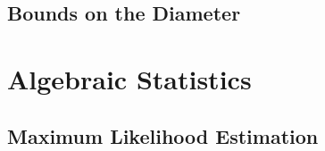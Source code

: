 \documentclass[12pt,a4paper]{book}
\theoremstyle{theorem}
\theoremstyle{definition}
\theoremstyle{remark}
\begin{document}


	



\chapter{Bounds on the Diameter} \label{ch:BoundsDiameter}


	







\part{Algebraic Statistics}\label{part:AlgebraicStatistics}


\chapter{Maximum Likelihood Estimation}\label{ch:MLestimation}
\end{document}

